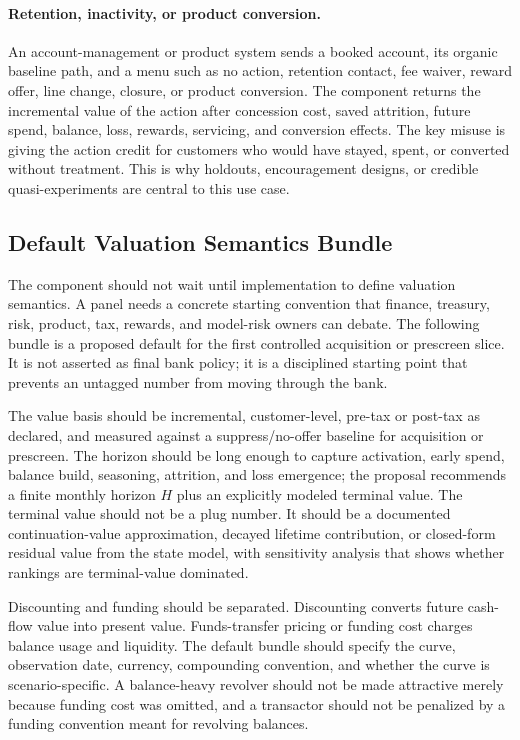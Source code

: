 \documentclass[11pt]{article}
\newcommand{\1}{\mathbf{1}}
\begin{document}
\paragraph{Retention, inactivity, or product conversion.}
An account-management or product system sends a booked account, its organic
baseline path, and a menu such as no action, retention contact, fee waiver,
reward offer, line change, closure, or product conversion. The component
returns the incremental value of the action after concession cost, saved
attrition, future spend, balance, loss, rewards, servicing, and conversion
effects. The key misuse is giving the action credit for customers who would
have stayed, spent, or converted without treatment. This is why holdouts,
encouragement designs, or credible quasi-experiments are central to this use
case.

\subsection{Default Valuation Semantics Bundle}
\label{sec:valuation-semantics-default}

The component should not wait until implementation to define valuation
semantics. A panel needs a concrete starting convention that finance, treasury,
risk, product, tax, rewards, and model-risk owners can debate. The following
bundle is a proposed default for the first controlled acquisition or prescreen
slice. It is not asserted as final bank policy; it is a disciplined starting
point that prevents an untagged number from moving through the bank.

The value basis should be incremental, customer-level, pre-tax or post-tax as
declared, and measured against a suppress/no-offer baseline for acquisition or
prescreen. The horizon should be long enough to capture activation, early
spend, balance build, seasoning, attrition, and loss emergence; the proposal
recommends a finite monthly horizon $H$ plus an explicitly modeled terminal
value. The terminal value should not be a plug number. It should be a
documented continuation-value approximation, decayed lifetime contribution, or
closed-form residual value from the state model, with sensitivity analysis that
shows whether rankings are terminal-value dominated.

Discounting and funding should be separated. Discounting converts future
cash-flow value into present value. Funds-transfer pricing or funding cost
charges balance usage and liquidity. The default bundle should specify the
curve, observation date, currency, compounding convention, and whether the
curve is scenario-specific. A balance-heavy revolver should not be made
attractive merely because funding cost was omitted, and a transactor should
not be penalized by a funding convention meant for revolving balances.
\end{document}
